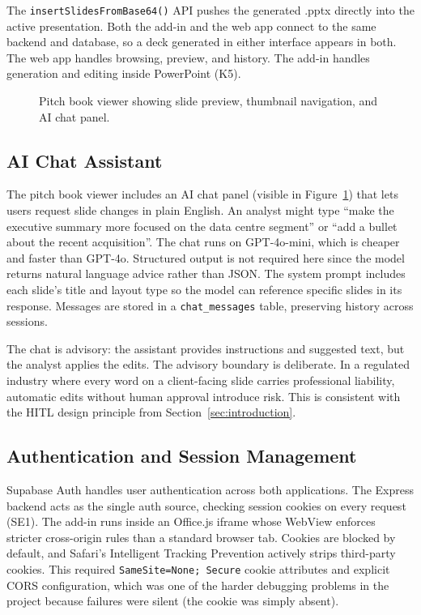The \texttt{insertSlidesFromBase64()} API pushes the generated .pptx directly into the active presentation. Both the add-in and the web app connect to the same backend and database, so a deck generated in either interface appears in both. The web app handles browsing, preview, and history. The add-in handles generation and editing inside PowerPoint (K5).

\begin{figure}[H]
\centering
{}
\caption{Pitch book viewer showing slide preview, thumbnail navigation, and AI chat panel.}
\label{fig:pitchbook-viewer}
\end{figure}

\subsection{AI Chat Assistant}
\label{sec:ai-chat}

The pitch book viewer includes an AI chat panel (visible in Figure~\ref{fig:pitchbook-viewer}) that lets users request slide changes in plain English. An analyst might type ``make the executive summary more focused on the data centre segment'' or ``add a bullet about the recent acquisition''. The chat runs on GPT-4o-mini, which is cheaper and faster than GPT-4o. Structured output is not required here since the model returns natural language advice rather than JSON. The system prompt includes each slide's title and layout type so the model can reference specific slides in its response. Messages are stored in a \texttt{chat\_messages} table, preserving history across sessions.

The chat is advisory: the assistant provides instructions and suggested text, but the analyst applies the edits. The advisory boundary is deliberate. In a regulated industry where every word on a client-facing slide carries professional liability, automatic edits without human approval introduce risk. This is consistent with the HITL design principle from Section~\ref{sec:introduction}.

\subsection{Authentication and Session Management}

Supabase Auth handles user authentication across both applications. The Express backend acts as the single auth source, checking session cookies on every request (SE1). The add-in runs inside an Office.js iframe whose WebView enforces stricter cross-origin rules than a standard browser tab. Cookies are blocked by default, and Safari's Intelligent Tracking Prevention actively strips third-party cookies. This required \texttt{SameSite=None; Secure} cookie attributes and explicit CORS configuration, which was one of the harder debugging problems in the project because failures were silent (the cookie was simply absent).

